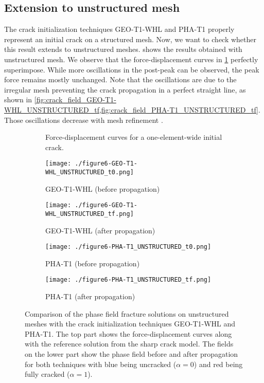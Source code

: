 \documentclass[OptSoft]{jtcam_preprint}
\begin{document}
\subsection{Extension to unstructured mesh}
The crack initialization techniques GEO-T1-WHL and PHA-T1 properly represent an initial crack on a structured mesh.
Now, we want to check whether this result extends to unstructured meshes.
 shows the results obtained with unstructured mesh.
We observe that the force-displacement curves in \cref{fig:Fu_unstructured} perfectly superimpose.
While more oscillations in the post-peak can be observed, the peak force remains mostly unchanged.
Note that the oscillations are due to the irregular mesh preventing the crack propagation in a perfect straight line, as shown in \cref{fig:crack_field_GEO-T1-WHL_UNSTRUCTURED_tf,fig:crack_field_PHA-T1_UNSTRUCTURED_tf}.
Those oscillations decrease with mesh refinement \parencite{loiseau_path-following_2025}.

\begin{figure}
  \centering
  \begin{subfigure}{\textwidth}
    \centering
    
    \caption{Force-displacement curves for a one-element-wide initial crack.}
    \label{fig:Fu_unstructured}
  \end{subfigure}
  \begin{subfigure}{0.49\textwidth}
    \centering
    \texttt{[image: ./figure6-GEO-T1-WHL\_UNSTRUCTURED\_t0.png]}
    \caption{GEO-T1-WHL (before propagation)}
    \label{fig:crack_field_GEO-T1-WHL_UNSTRUCTURED_t0}
  \end{subfigure}
  \begin{subfigure}{0.49\textwidth}
    \centering
    \texttt{[image: ./figure6-GEO-T1-WHL\_UNSTRUCTURED\_tf.png]}
    \caption{GEO-T1-WHL (after propagation)}
    \label{fig:crack_field_GEO-T1-WHL_UNSTRUCTURED_tf}
  \end{subfigure}
  \begin{subfigure}{0.49\textwidth}
    \centering
    \texttt{[image: ./figure6-PHA-T1\_UNSTRUCTURED\_t0.png]}
    \caption{PHA-T1 (before propagation)}
    \label{fig:crack_field_PHA-T1_UNSTRUCTURED_t0}
  \end{subfigure}
  \begin{subfigure}{0.49\textwidth}
    \centering
    \texttt{[image: ./figure6-PHA-T1\_UNSTRUCTURED\_tf.png]}
    \caption{PHA-T1 (after propagation)}
    \label{fig:crack_field_PHA-T1_UNSTRUCTURED_tf}
  \end{subfigure}
  \caption{Comparison of the phase field fracture solutions on unstructured meshes with the crack initialization techniques GEO-T1-WHL and PHA-T1. The top part shows the force-displacement curves along with the reference solution from the sharp crack model. The fields on the lower part show the phase field before and after propagation for both techniques with blue being uncracked ($\alpha=0$) and red being fully cracked ($\alpha=1$).}
  \label{fig:initial_cracks_in_unstructured_meshes}
\end{figure}
\end{document}
